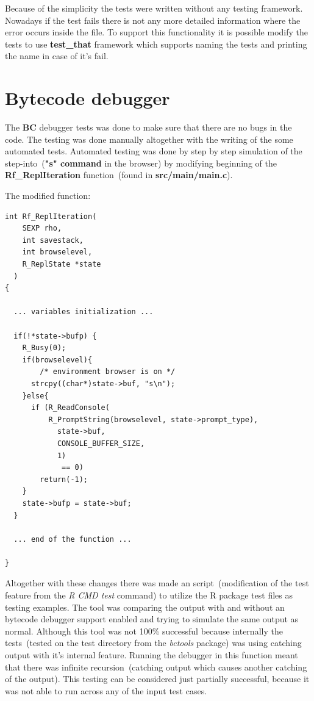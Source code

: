 \documentclass[thesis=M,english]{FITthesis}[2018/10/20]
\begin{document}
Because of the simplicity the tests were written without any testing framework. Nowadays if the test fails there is not any more detailed information where the error occurs inside the file. To support this functionality it is possible modify the tests to use \textbf{test{\_}that} framework which supports naming the tests and printing the name in case of it's fail. 

\section{Bytecode debugger}

The \textbf{BC} debugger tests was done to make sure that there are no bugs in the code. The testing was done manually altogether with the writing of the some automated tests. Automated testing was done by step by step simulation of the step-into~(\textbf{"s" command} in the browser) by modifying beginning of the \textbf{Rf{\_}ReplIteration} function~(found in \textbf{src/main/main.c}). 

The modified function:
\begin{lstlisting}
int Rf_ReplIteration(
	SEXP rho, 
	int savestack, 
	int browselevel, 
	R_ReplState *state
  )
{

  ... variables initialization ...

  if(!*state->bufp) {
    R_Busy(0);
    if(browselevel){	
    	/* environment browser is on */
      strcpy((char*)state->buf, "s\n");
    }else{
      if (R_ReadConsole(
      	  R_PromptString(browselevel, state->prompt_type),
            state->buf, 
            CONSOLE_BUFFER_SIZE, 
            1)
             == 0)
        return(-1);
    }
    state->bufp = state->buf;
  }

  ... end of the function ...

}
\end{lstlisting}

Altogether with these changes there was made an script~(modification of the test feature from the \textit{R CMD test} command) to utilize the R package test files as testing examples. The tool was comparing the output with and without an bytecode debugger support enabled and trying to simulate the same output as normal. Although this tool was not 100\% successful because internally the tests~(tested on the test directory from the \textit{bctools} package) was using catching output with it's internal feature. Running the debugger in this function meant that there was infinite recursion~(catching output which causes another catching of the output). This testing can be considered just partially successful, because it was not able to run across any of the input test cases. 
\end{document}
